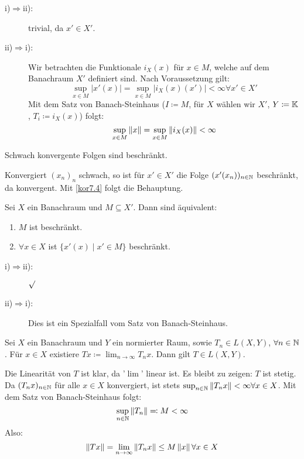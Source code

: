 \begin{beweis}
	\begin{description}
		\item[i)$ \Rightarrow $ii):] trivial, da $ x'\in X' $.
		\item[ii)$ \Rightarrow $i):] Wir betrachten die Funktionale $ i_X(x) $ f\"ur $ x\in M $, welche auf dem Banachraum $ X' $ definiert sind. Nach Voraussetzung gilt:
		\[ \sup_{x\in M}|x'(x)|=\sup_{x\in M}|i_X(x)(x')|<\infty\forall x'\in X' \]
		Mit dem Satz von Banach-Steinhaus ($ I\coloneqq M $, f\"ur $ X $ w\"ahlen wir $ X' $, $ Y\coloneqq\mathbb{K} $, $ T_i\coloneqq i_X(x) $) folgt:
		\[ \sup_{x\in M}\left\|x\right\|=\sup_{x\in M}\left\|i_X(x)\right\|<\infty \]
	\end{description}
\end{beweis}
\begin{korollar}
	Schwach konvergente Folgen sind beschr\"ankt.
\end{korollar}
\begin{beweis}
	Konvergiert $ (x_n)_n $ schwach, so ist f\"ur $ x'\in X' $ die Folge $ (x'(x_n))_{n\in\mathbb{N}} $ beschr\"ankt, da konvergent. Mit \ref{kor7.4} folgt die Behauptung.
\end{beweis}
\begin{korollar}
	Sei $ X $ ein Banachraum und $ M\subseteq X' $. Dann sind \"aquivalent:
	\begin{enumerate}
		\item $ M $ ist beschr\"ankt.
		\item $ \forall x\in X $ ist $ \lbrace x'(x)\mid x'\in M\rbrace $ beschr\"ankt.
	\end{enumerate}
\end{korollar}
\begin{beweis}
	\begin{description}
		\item[i)$ \Rightarrow $ii):] $ \surd $
		\item[ii)$ \Rightarrow $i):] Dies ist ein Spezialfall vom Satz von Banach-Steinhaus.
	\end{description}
\end{beweis}
\begin{korollar}
	Sei $ X $ ein Banachraum und $ Y $ ein normierter Raum, sowie $ T_n\in L(X,Y) $, $ \forall n\in\mathbb{N} $. F\"ur $ x\in X $ existiere $ Tx\coloneqq\lim_{n\to\infty} T_nx $. Dann gilt $ T\in L(X,Y) $. 
\end{korollar}
\begin{beweis}
	Die Linearit\"at von $ T $ ist klar, da '$ \lim $' linear ist. Es bleibt zu zeigen: $ T $ ist stetig. Da $ (T_nx)_{n\in\mathbb{N}} $ f\"ur alle $ x\in X $ konvergiert, ist stets $ \sup_{n\in\mathbb{N}}\left\|T_nx\right\|<\infty\forall x\in X $. Mit dem Satz von Banach-Steinhaus folgt:
	\[ \sup_{n\in\mathbb{N}}\left\|T_n\right\|\eqqcolon M<\infty \]
	Also:
	\[ \left\|Tx\right\|=\lim_{n\to\infty}\left\|T_nx\right\|\leq M\left\|x\right\|\forall x\in X \]
\end{beweis}
